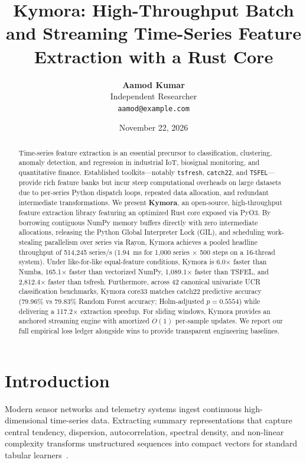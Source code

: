 \documentclass[10pt,twocolumn,letterpaper]{article}
\title{\textbf{Kymora: High-Throughput Batch and Streaming Time-Series Feature Extraction with a Rust Core}}
\author{
  \textbf{Aamod Kumar} \\
  Independent Researcher \\
  \texttt{aamod@example.com}
}
\date{November 22, 2026}
\begin{document}
\maketitle

\begin{abstract}
Time-series feature extraction is an essential precursor to classification, clustering, anomaly detection, and regression in industrial IoT, biosignal monitoring, and quantitative finance. Established toolkits---notably \texttt{tsfresh}, \texttt{catch22}, and \texttt{TSFEL}---provide rich feature banks but incur steep computational overheads on large datasets due to per-series Python dispatch loops, repeated data allocation, and redundant intermediate transformations. We present \textbf{Kymora}, an open-source, high-throughput feature extraction library featuring an optimized Rust core exposed via PyO3. By borrowing contiguous NumPy memory buffers directly with zero intermediate allocations, releasing the Python Global Interpreter Lock (GIL), and scheduling work-stealing parallelism over series via Rayon, Kymora achieves a pooled headline throughput of 514,245 series/s (1.94~ms for 1,000 series $\times$ 500 steps on a 16-thread system). Under like-for-like equal-feature conditions, Kymora is 6.0$\times$ faster than Numba, 165.1$\times$ faster than vectorized NumPy, 1,089.1$\times$ faster than TSFEL, and 2,812.4$\times$ faster than tsfresh. Furthermore, across 42 canonical univariate UCR classification benchmarks, Kymora core33 matches catch22 predictive accuracy (79.96\% vs 79.83\% Random Forest accuracy; Holm-adjusted $p=0.5554$) while delivering a 117.2$\times$ extraction speedup. For sliding windows, Kymora provides an anchored streaming engine with amortized $O(1)$ per-sample updates. We report our full empirical loss ledger alongside wins to provide transparent engineering baselines.
\end{abstract}

\section{Introduction}
Modern sensor networks and telemetry systems ingest continuous high-dimensional time-series data. Extracting summary representations that capture central tendency, dispersion, autocorrelation, spectral density, and non-linear complexity transforms unstructured sequences into compact vectors for standard tabular learners~\cite{christ2018tsfresh,lubba2019catch22,barandas2020tsfel}.
\end{document}
